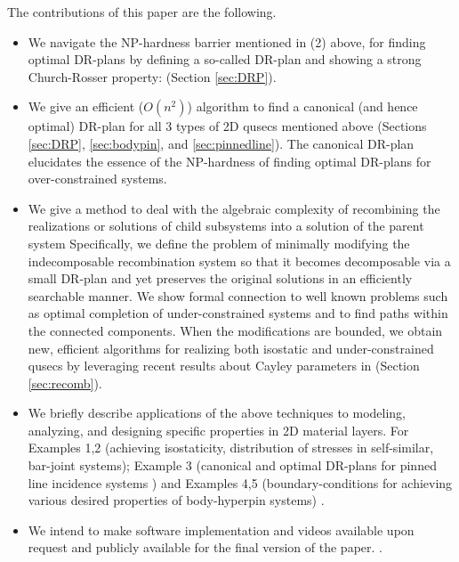 The contributions of this paper are the following.
\begin{itemize}
  \item We navigate the NP-hardness barrier mentioned in (2) above,
  for finding optimal DR-plans by defining a so-called 
  DR-plan and showing a strong Church-Rosser property:  (Section \ref{sec:DRP}).

  \item We give an efficient ($O(n^2)$) algorithm to find a canonical
  (and hence optimal) DR-plan for all 3 types of 2D qusecs mentioned
  above (Sections \ref{sec:DRP}, \ref{sec:bodypin}, and
  \ref{sec:pinnedline}). The canonical DR-plan elucidates the essence
  of the NP-hardness of finding optimal DR-plans for over-constrained
  systems.

  \item We give a method to deal with the algebraic complexity of
  recombining the realizations or solutions of child subsystems into a
  solution of the parent system
\cite{sitharam2010optimized,sitharam2006well,sitharam2010reconciling}
  Specifically, we define the problem
  of minimally modifying the indecomposable recombination system so
  that it becomes decomposable via a small DR-plan and yet preserves
  the original solutions in an efficiently searchable manner. We show
  formal connection to well known problems such as optimal completion
  of under-constrained systems
\cite{joan-arinyo2003transforming,sitharam2005combinatorial,gao2006ctree}
  and to find paths within the connected components. When the
  modifications are bounded, we obtain new, efficient algorithms for
  realizing both isostatic and under-constrained qusecs by leveraging
  recent results about Cayley parameters in
\cite{sitharam2010convex,sitharam2011cayleyI,sitharam2011cayleyII}
  (Section
  \ref{sec:recomb}).

  \item We briefly describe applications of the above techniques to
  modeling, analyzing, and designing specific properties in 2D material
  layers. For Examples 1,2 (achieving isostaticity, distribution of
  stresses in self-similar, bar-joint systems); Example 3 (canonical
  and optimal DR-plans for pinned line incidence systems
  \cite{sitharam2014incidence})
  and Examples 4,5 (boundary-conditions for achieving various desired
  properties of body-hyperpin systems) \uncited.

  \item We intend to make software implementation and videos available
  upon request and publicly available for the final version of the
  paper.
  .
\end{itemize}
